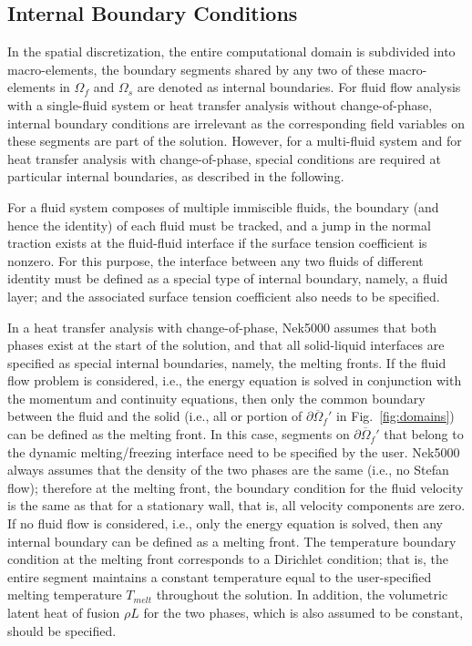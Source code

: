 
\subsection{Internal Boundary Conditions}

In the spatial discretization, the entire computational
domain is subdivided into macro-elements, the boundary
segments shared by any two of these macro-elements
in \(\Omega_f\) and \(\Omega_s\) are denoted as internal boundaries.
For fluid flow analysis with a single-fluid system or heat
transfer analysis without change-of-phase, internal
boundary conditions are irrelevant as the corresponding
field variables on these segments are part of the
solution. However, for a multi-fluid system and for
heat transfer analysis with change-of-phase, special
conditions are required at particular internal
boundaries, as described in the following.

For a fluid system composes of multiple immiscible fluids,
the boundary (and hence the identity) of each fluid must
be tracked, and a jump in the normal traction exists
at the fluid-fluid interface if the surface tension
coefficient is nonzero.
For this purpose, the interface between any two fluids
of different identity must be defined as a special type of
internal boundary, namely, a fluid layer;
and the associated surface tension coefficient also
needs to be specified.

In a heat transfer analysis with change-of-phase, Nek5000 assumes
that both phases exist at the start of the solution, and that
all solid-liquid interfaces are specified as special internal
boundaries, namely, the melting fronts.
If the fluid flow problem is considered, i.e., the energy
equation is solved in conjunction with the momentum and
continuity equations, then only
the common boundary between the fluid and the solid
(i.e., all or portion of \(\partial \overline{\Omega}_f'\) in Fig.~\ref{fig:domains})
can be defined as the melting front.
In this case, segments on \(\partial \overline{\Omega}_f'\) that
belong to the dynamic melting/freezing interface need to be
specified by the user.
Nek5000 always assumes that the density of the two phases
are the same (i.e., no Stefan flow); therefore at the melting
front, the boundary condition for the fluid velocity is the
same as that for a stationary wall, that is, all velocity
components are zero.
If no fluid flow is considered, i.e., only the energy equation
is solved, then any internal boundary can be defined as
a melting front.
The temperature boundary condition at the melting front
corresponds to a Dirichlet
condition; that is, the entire segment maintains a constant temperature
equal to the user-specified melting temperature \(T_{melt}\)
throughout the solution.
In addition, the volumetric latent heat of fusion \(\rho L\)
for the two phases,
which is also assumed to be constant, should be specified.
